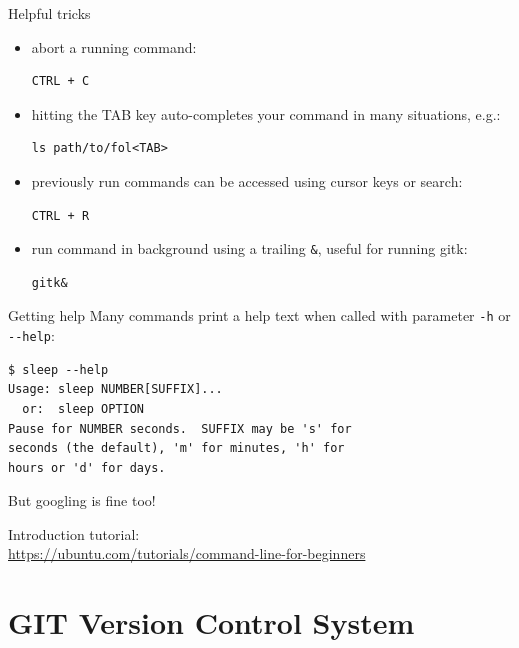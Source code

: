 \begin{frame}[fragile]{Helpful tricks}
    \begin{itemize}
        \item abort a running command:
            \begin{verbatim}CTRL + C\end{verbatim}\pause
        \item hitting the TAB key auto-completes your command in many situations, e.g.:
            \begin{verbatim}ls path/to/fol<TAB>\end{verbatim}\pause
        \item previously run commands can be accessed using cursor keys or search:
            \begin{verbatim}CTRL + R\end{verbatim}\pause
        \item run command in background using a trailing \verb|&|, useful for running gitk:
            \begin{verbatim}gitk&\end{verbatim}
    \end{itemize}
\end{frame}


\begin{frame}[fragile]{Getting help}
    Many commands print a help text when called with parameter \verb|-h| or \verb|--help|:
\begin{verbatim}$ sleep --help
Usage: sleep NUMBER[SUFFIX]...
  or:  sleep OPTION
Pause for NUMBER seconds.  SUFFIX may be 's' for
seconds (the default), 'm' for minutes, 'h' for
hours or 'd' for days.
\end{verbatim}

\bigskip
\pause

But googling is fine too!

\bigskip
\pause
Introduction tutorial:\\
\href{https://ubuntu.com/tutorials/command-line-for-beginners}{https://ubuntu.com/tutorials/command-line-for-beginners}

\end{frame}


\section{GIT Version Control System}


